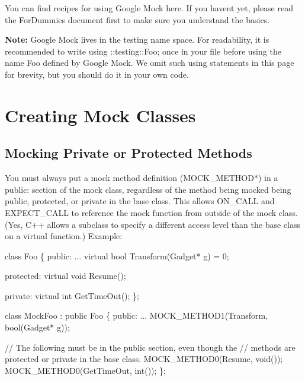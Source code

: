You can find recipes for using Google Mock here. If you haven\textquotesingle{}t yet, please read the For\+Dummies document first to make sure you understand the basics.

{\bfseries Note\+:} Google Mock lives in the {\ttfamily testing} name space. For readability, it is recommended to write {\ttfamily using \+::testing\+::\+Foo;} once in your file before using the name {\ttfamily Foo} defined by Google Mock. We omit such {\ttfamily using} statements in this page for brevity, but you should do it in your own code.

\section*{Creating Mock Classes}

\subsection*{Mocking Private or Protected Methods}

You must always put a mock method definition ({\ttfamily M\+O\+C\+K\+\_\+\+M\+E\+T\+H\+O\+D$\ast$}) in a {\ttfamily public\+:} section of the mock class, regardless of the method being mocked being {\ttfamily public}, {\ttfamily protected}, or {\ttfamily private} in the base class. This allows {\ttfamily O\+N\+\_\+\+C\+A\+LL} and {\ttfamily E\+X\+P\+E\+C\+T\+\_\+\+C\+A\+LL} to reference the mock function from outside of the mock class. (Yes, C++ allows a subclass to specify a different access level than the base class on a virtual function.) Example\+:


\begin{DoxyCode}
\textcolor{keyword}{class }Foo \{
 \textcolor{keyword}{public}:
  ...
  \textcolor{keyword}{virtual} \textcolor{keywordtype}{bool} Transform(Gadget* g) = 0;

 \textcolor{keyword}{protected}:
  \textcolor{keyword}{virtual} \textcolor{keywordtype}{void} Resume();

 \textcolor{keyword}{private}:
  \textcolor{keyword}{virtual} \textcolor{keywordtype}{int} GetTimeOut();
\};

\textcolor{keyword}{class }MockFoo : \textcolor{keyword}{public} Foo \{
 \textcolor{keyword}{public}:
  ...
  MOCK\_METHOD1(Transform, \textcolor{keywordtype}{bool}(Gadget* g));

  \textcolor{comment}{// The following must be in the public section, even though the}
  \textcolor{comment}{// methods are protected or private in the base class.}
  MOCK\_METHOD0(Resume, \textcolor{keywordtype}{void}());
  MOCK\_METHOD0(GetTimeOut, \textcolor{keywordtype}{int}());
\};
\end{DoxyCode}


